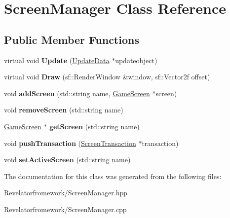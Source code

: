 \hypertarget{class_screen_manager}{\section{Screen\-Manager Class Reference}
\label{class_screen_manager}
}
\subsection*{Public Member Functions}
\begin{DoxyCompactItemize}
\item 
\hypertarget{class_screen_manager_a269d1b374ba195a036f03bd3caa897d9}{virtual void {\bfseries Update} (\hyperlink{class_update_data}{Update\-Data} $\ast$updateobject)}\label{class_screen_manager_a269d1b374ba195a036f03bd3caa897d9}

\item 
\hypertarget{class_screen_manager_abcf990ad052121e6ebd2ab03771657df}{virtual void {\bfseries Draw} (sf\-::\-Render\-Window \&window, sf\-::\-Vector2f offset)}\label{class_screen_manager_abcf990ad052121e6ebd2ab03771657df}

\item 
\hypertarget{class_screen_manager_a2e6e206c2ff265c534c802898c9c078b}{void {\bfseries add\-Screen} (std\-::string name, \hyperlink{class_game_screen}{Game\-Screen} $\ast$screen)}\label{class_screen_manager_a2e6e206c2ff265c534c802898c9c078b}

\item 
\hypertarget{class_screen_manager_a9bb115d54e94b72618361f4a347e26c8}{void {\bfseries remove\-Screen} (std\-::string name)}\label{class_screen_manager_a9bb115d54e94b72618361f4a347e26c8}

\item 
\hypertarget{class_screen_manager_a510ee04534746a6e72fa789539dc2d83}{\hyperlink{class_game_screen}{Game\-Screen} $\ast$ {\bfseries get\-Screen} (std\-::string name)}\label{class_screen_manager_a510ee04534746a6e72fa789539dc2d83}

\item 
\hypertarget{class_screen_manager_aa806de1587575859315d975daa025688}{void {\bfseries push\-Transaction} (\hyperlink{class_screen_transaction}{Screen\-Transaction} $\ast$transaction)}\label{class_screen_manager_aa806de1587575859315d975daa025688}

\item 
\hypertarget{class_screen_manager_a578dea02971b86905fee58593622495b}{void {\bfseries set\-Active\-Screen} (std\-::string name)}\label{class_screen_manager_a578dea02971b86905fee58593622495b}

\end{DoxyCompactItemize}


The documentation for this class was generated from the following files\-:\begin{DoxyCompactItemize}
\item 
Revelatorfromework/Screen\-Manager.\-hpp\item 
Revelatorfromework/Screen\-Manager.\-cpp\end{DoxyCompactItemize}
